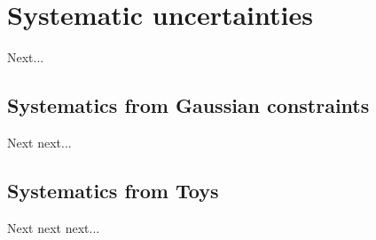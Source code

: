 \chapter{Systematic uncertainties}
\label{ch:systeamticUncerts}

Next...

\section{Systematics from Gaussian constraints}

Next next...

\section{Systematics from Toys}

Next next next...
